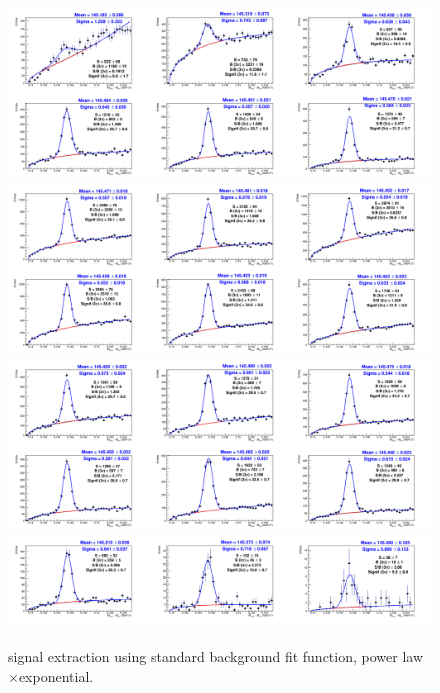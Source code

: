 \begin{figure}[!h]
\begin{center}
\includegraphics[width=1\textwidth]{figures/Dstar/pp13TeV/multi_trial/Mass_Spectra_stdBkg_1-4GeV.png} 
\includegraphics[width=1\textwidth]{figures/Dstar/pp13TeV/multi_trial/Mass_Spectra_stdBkg_4-7GeV.png}
\includegraphics[width=1\textwidth]{figures/Dstar/pp13TeV/multi_trial/Mass_Spectra_stdBkg_7-16GeV.png}
\includegraphics[width=1\textwidth]{figures/Dstar/pp13TeV/multi_trial/Mass_Spectra_stdBkg_16-50GeV-v2.png} %
\caption{\Dstar signal extraction using standard background fit function, power law$\times$exponential.}
\label{fig:DstarYield_stdbkg}
\end{center}
\end{figure}



